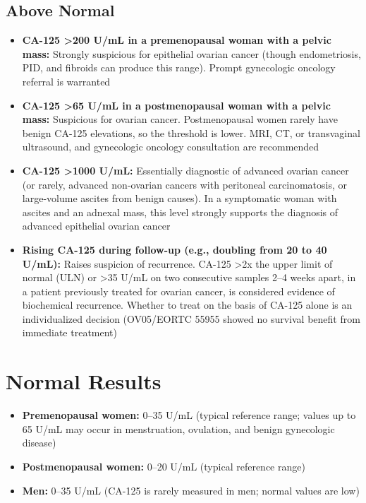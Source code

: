 \subsection*{Above Normal}
\begin{itemize}
  \item \textbf{CA-125 >200 U/mL in a premenopausal woman with a pelvic mass:} Strongly suspicious for epithelial ovarian cancer (though endometriosis, PID, and fibroids can produce this range). Prompt gynecologic oncology referral is warranted
  \item \textbf{CA-125 >65 U/mL in a postmenopausal woman with a pelvic mass:} Suspicious for ovarian cancer. Postmenopausal women rarely have benign CA-125 elevations, so the threshold is lower. MRI, CT, or transvaginal ultrasound, and gynecologic oncology consultation are recommended
  \item \textbf{CA-125 >1000 U/mL:} Essentially diagnostic of advanced ovarian cancer (or rarely, advanced non-ovarian cancers with peritoneal carcinomatosis, or large-volume ascites from benign causes). In a symptomatic woman with ascites and an adnexal mass, this level strongly supports the diagnosis of advanced epithelial ovarian cancer
  \item \textbf{Rising CA-125 during follow-up (e.g., doubling from 20 to 40 U/mL):} Raises suspicion of recurrence. CA-125 >2x the upper limit of normal (ULN) or >35 U/mL on two consecutive samples 2--4 weeks apart, in a patient previously treated for ovarian cancer, is considered evidence of biochemical recurrence. Whether to treat on the basis of CA-125 alone is an individualized decision (OV05/EORTC 55955 showed no survival benefit from immediate treatment)
\end{itemize}

\section*{Normal Results}
\begin{itemize}
  \item \textbf{Premenopausal women:} 0--35 U/mL (typical reference range; values up to 65 U/mL may occur in menstruation, ovulation, and benign gynecologic disease)
  \item \textbf{Postmenopausal women:} 0--20 U/mL (typical reference range)
  \item \textbf{Men:} 0--35 U/mL (CA-125 is rarely measured in men; normal values are low)
\end{itemize}

